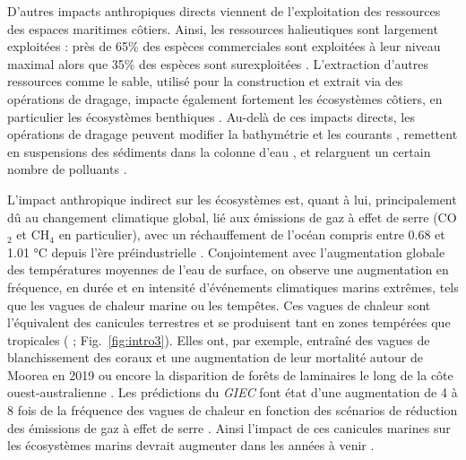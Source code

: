 \begin{refsection}
D'autres impacts anthropiques directs viennent de l'exploitation des
ressources des espaces maritimes côtiers. Ainsi, les ressources
halieutiques sont largement exploitées : près de 65\% des espèces
commerciales sont exploitées à leur niveau maximal alors que 35\% des
espèces sont surexploitées \autocite{FAO_yearbook_2022}. L'extraction
d'autres ressources comme le sable, utilisé pour la construction et
extrait via des opérations de dragage, impacte également fortement les
écosystèmes côtiers, en particulier les écosystèmes benthiques
\autocites[ ]{Boyd_2003}[ ]{Boyd_2005}{Erftemeijer_2006}. Au-delà de ces
impacts directs, les opérations de dragage peuvent modifier la
bathymétrie et les courants \autocite{Bray_2008}, remettent en
suspensions des sédiments dans la colonne d'eau
\autocite[@][]{Erftemeijer_2006}, et relarguent un certain nombre de
polluants \autocite{Filho_2004}.

L'impact anthropique indirect sur les écosystèmes est, quant à lui,
principalement dû au changement climatique global, lié aux émissions de
gaz à effet de serre (CO\(_\text{2}\) et CH\(_\text{4}\) en
particulier), avec un réchauffement de l'océan compris entre 0.68 et
1.01 °C depuis l'ère préindustrielle \autocite{ipcccryosphere_2021}.
Conjointement avec l'augmentation globale des températures moyennes de
l'eau de surface, on observe une augmentation en fréquence, en durée et
en intensité d'événements climatiques marins extrêmes, tels que les
vagues de chaleur marine \autocite{Oliver_2018} ou les tempêtes. Ces
vagues de chaleur sont l'équivalent des canicules terrestres et se
produisent tant en zones tempérées que tropicales
(\textcite{Hobday_2016} ; Fig.~\ref{fig:intro3}). Elles ont, par
exemple, entraîné des vagues de blanchissement des coraux et une
augmentation de leur mortalité autour de Moorea en 2019
\autocite{Wyatt_2023} ou encore la disparition de forêts de laminaires
le long de la côte ouest-australienne \autocite{Wernberg_2016}. Les
prédictions du \emph{GIEC} font état d'une augmentation de 4 à 8 fois de
la fréquence des vagues de chaleur en fonction des scénarios de
réduction des émissions de gaz à effet de serre
\autocite{ipcccryosphere_2021}. Ainsi l'impact de ces canicules marines
sur les écosystèmes marins devrait augmenter dans les années à venir
\autocites[ ]{Oliver_2018}{Smith_2023}.


\end{refsection}
